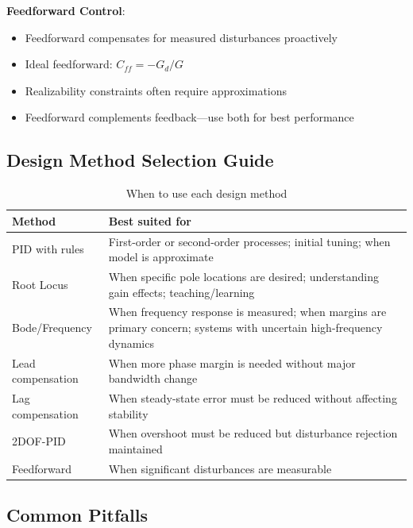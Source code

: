 \textbf{Feedforward Control}:
\begin{itemize}
    \item Feedforward compensates for measured disturbances proactively
    \item Ideal feedforward: $C_{ff} = -G_d/G$
    \item Realizability constraints often require approximations
    \item Feedforward complements feedback---use both for best performance
\end{itemize}

\subsection{Design Method Selection Guide}

\begin{table}[htbp]
\centering
\caption{When to use each design method}
\label{tab:method_selection}
\begin{tabular}{@{}p{3cm}p{10cm}@{}}
\toprule
\textbf{Method} & \textbf{Best suited for} \\
\midrule
PID with rules & First-order or second-order processes; initial tuning; when model is approximate \\
Root Locus & When specific pole locations are desired; understanding gain effects; teaching/learning \\
Bode/Frequency & When frequency response is measured; when margins are primary concern; systems with uncertain high-frequency dynamics \\
Lead compensation & When more phase margin is needed without major bandwidth change \\
Lag compensation & When steady-state error must be reduced without affecting stability \\
2DOF-PID & When overshoot must be reduced but disturbance rejection maintained \\
Feedforward & When significant disturbances are measurable \\
\bottomrule
\end{tabular}
\end{table}

\subsection{Common Pitfalls}

